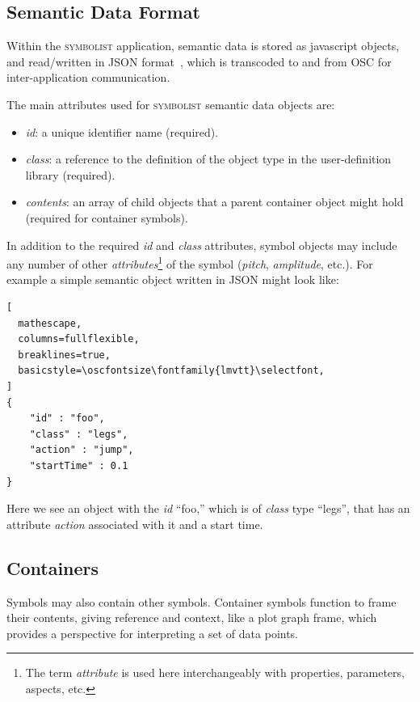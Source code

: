 \documentclass{article}
\def\symbolist{\textsc{symbolist}\xspace}
\def\oscfontsize{\footnotesize}
\begin{document}
\subsection{Semantic Data Format}\label{subsec:format}

Within the \symbolist application, semantic data is stored as javascript objects, and read/written in JSON format~\cite{crockford2012json}, which is transcoded to and from OSC for inter-application communication.

The main attributes used for \symbolist semantic data objects are:

\begin{itemize}\itemsep0pt 
\item \textit{id}: a unique identifier name (required).
\item \textit{class}: a reference to the definition of the object type in the user-definition library (required).
\item \textit{contents}: an array of child objects that a parent container object might hold (required for container symbols).
\end{itemize}

In addition to the required \textit{id} and \textit{class} attributes, symbol objects may include any number of other \textit{attributes}\footnote{The term \textit{attribute} is used here interchangeably with properties, parameters, aspects, etc.} of the symbol (\textit{pitch}, \textit{amplitude}, etc.). For example a simple semantic object written in JSON might look like:

\begin{lstlisting}[
  mathescape,
  columns=fullflexible,
  breaklines=true,
  basicstyle=\oscfontsize\fontfamily{lmvtt}\selectfont,
]
{
    "id" : "foo",
    "class" : "legs",
    "action" : "jump",
    "startTime" : 0.1
}
\end{lstlisting}

\noindent
Here we see an object with the \textit{id} ``foo,'' which is of \textit{class} type ``legs'', that has an attribute \textit{action} associated with it and a start time.

\subsection{Containers}
Symbols may also contain other symbols. 
Container symbols function to frame their contents, giving reference and context, like a plot graph frame, which provides a perspective for interpreting a set of data points.
\end{document}
